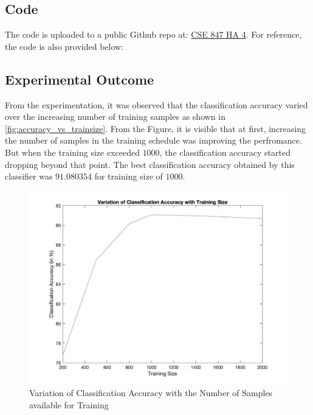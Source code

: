 \documentclass[11pt]{article}
\begin{document}
\subsection{Code}
The code is uploaded to a public Github repo at: \href{https://github.com/Ritam-Guha/MSU-Courses/tree/master/CSE\%20847\%20(Machine\%20Learning)/Assignments/HA4}{CSE 847 HA 4}. For reference, the code is also provided below:


\subsection{Experimental Outcome}
From the experimentation, it was observed that the classification accuracy varied over the increasing number of training samples as shown in \autoref{fig:accuracy_vs_trainsize}. From the Figure, it is visible that at first, increasing the number of samples in the training schedule was improving the perfromance. But when the training size exceeded $1000$, the classification accuracy started dropping beyond that point. 
The best classification accuracy obtained by this classifier was $91.080354$ for training size of $1000$.

\begin{figure}[H]
	\centering
	\begin{adjustbox}{width=0.6\paperwidth}
			\includegraphics{Codes/Results/Logistic Train/Accuracy_Variance}
	\end{adjustbox}
	\caption{Variation of Classification Accuracy with the Number of Samples available for Training}
	\label{fig:accuracy_vs_trainsize}
\end{figure}
\end{document}
